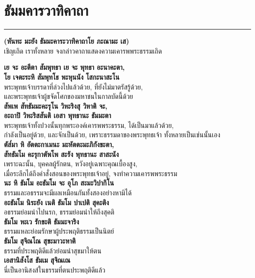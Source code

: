 \documentclass[12pt]{article}
\begin{document}
\section{ธัมมคารวาทิคาถา}
\hrule
\begin{center}
\textbf{(หันทะ มะยัง ธัมมะคาระวาทิคาถาโย ภะณามะ เส)}\\
เชิญเถิด เราทั้งหลาย จงกล่าวคาถาแสดงความเคารพพระธรรมเถิด
\end{center}
\textbf{เย จะ อะตีตา สัมพุทธา เย จะ พุทธา อะนาคะตา,\\
โย เจตะระหิ สัมพุทโธ พะหุนนัง โสกะนาสะโน}\\
\indent พระพุทธเจ้าบรรดาที่ล่วงไปแล้วด้วย, ที่ยังไม่มาตรัสรู้ด้วย,\\
\indent และพระพุทธเจ้าผู้ขจัดโศกของมหาชนในกาลบัดนี้ด้วย\\
\textbf{สัพเพ สัทธัมมะคะรุโน วิหะริงสุ วิหาติ จะ,\\
อะถาปิ วิหะริสสันติ เอสา พุทธานะ ธัมมะตา}\\
\indent พระพุทธเจ้าทั้งปวงนั้นทุกพระองค์เคารพพระธรรม, ได้เป็นมาแล้วด้วย,\\
\indent กำลังเป็นอยู่ด้วย, และจักเป็นด้วย, เพราะธรรมดาของพระพุทธเจ้า ทั้งหลายเป็นเช่นนั้นเอง\\
\textbf{ตัส๎มา หิ อัตตะกาเมนะ มะหัตตะมะภิกังขะตา,\\
สัทธัมโม คะรุกาตัพโพ สะรัง พุทธานะ สาสะนัง}\\
\indent เพราะฉะนั้น, บุคคลผู้รักตน, หวังอยู่เฉพาะคุณเบื้องสูง,\\
\indent เมื่อระลึกได้ถึงคำสั่งสอนของพระพุทธเจ้าอยู่, จงทำความเคารพพระธรรม\\
\textbf{นะ หิ ธัมโม อะธัมโม จะ อุโภ สะมะวิปากิโน}\\
\indent ธรรมและอธรรมจะมีผลเหมือนกันทั้งสองอย่างหามิได้\\
\textbf{อะธัมโม นิระยัง เนติ ธัมโม ปาเปติ สุคะติง}\\
\indent อธรรมย่อมนำไปนรก, ธรรมย่อมนำให้ถึงสุคติ\\
\textbf{ธัมโม หะเว รักขะติ ธัมมะจาริง}\\
\indent ธรรมแหละย่อมรักษาผู้ประพฤติธรรมเป็นนิตย์\\
\textbf{ธัมโม สุจิณโณ สุขะมาวะหาติ}\\
\indent ธรรมที่ประพฤติดีแล้วย่อมนำสุขมาให้ตน\\
\textbf{เอสานิสังโส ธัมเม สุจิณเณ}\\
\indent นี่เป็นอานิสงส์ในธรรมที่ตนประพฤติดีแล้ว\\

\pagebreak
\end{document}
